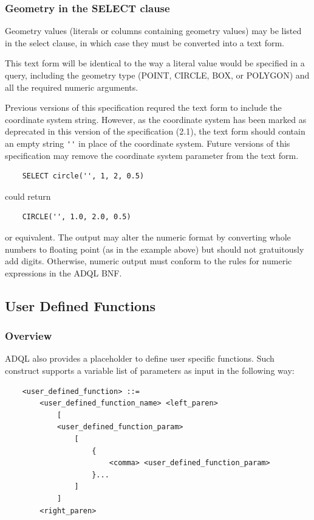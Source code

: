 \documentclass[11pt,a4paper]{ivoa}
\begin{document}
\subsubsection{Geometry in the SELECT clause}
\label{sec:geom.select}

Geometry values (literals or columns containing geometry values) may be
listed in the select clause, in which case they must be converted into a
text form.

This text form will be identical to the way a literal value would be
specified in a query, including the geometry type (POINT, CIRCLE, BOX,
or POLYGON) and all the required numeric arguments.

Previous versions of this specification requred the text form to include the
coordinate system string. However, as the coordinate system has been marked
as deprecated in this version of the specification (2.1), the text form
should contain an empty string \verb:'': in place of the coordinate
system. Future versions of this specification may remove the coordinate
system parameter from the text form.

\begin{verbatim}
    SELECT circle('', 1, 2, 0.5)
\end{verbatim}

could return

\begin{verbatim}
    CIRCLE('', 1.0, 2.0, 0.5)
\end{verbatim}

or equivalent.
The output may alter the numeric format by converting whole numbers to
floating point (as in the example above) but should not gratuitously add
digits. Otherwise, numeric output must conform to the rules for numeric
expressions in the ADQL BNF.

\subsection{User Defined Functions}
\label{sec:user.functions}
\subsubsection{Overview}

ADQL also provides a placeholder to define user specific functions. Such
construct supports a variable list of parameters as input in the following way:

\begin{verbatim}
    <user_defined_function> ::=
        <user_defined_function_name> <left_paren>
            [
            <user_defined_function_param>
                [
                    {
                        <comma> <user_defined_function_param>
                    }...
                ]
            ]
        <right_paren>
\end{verbatim}
\end{document}
